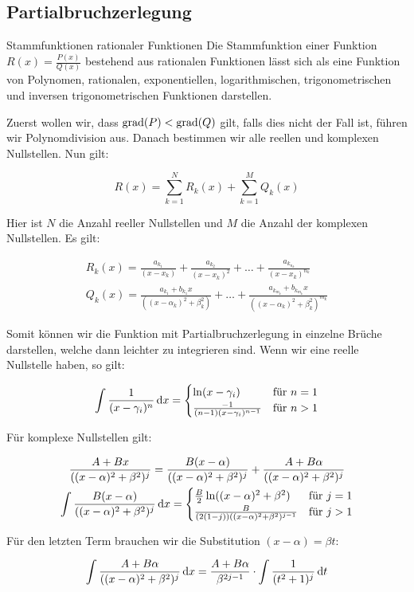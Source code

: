 \subsection{Partialbruchzerlegung}

\begin{KR}{Stammfunktionen rationaler Funktionen}
    Die Stammfunktion einer Funktion $R(x)=\frac{P(x)}{Q(x)}$ bestehend aus rationalen Funktionen lässt sich als eine Funktion von Polynomen, rationalen, exponentiellen, logarithmischen, trigonometrischen und inversen trigonometrischen Funktionen darstellen.

    Zuerst wollen wir, dass $\operatorname{grad}(P)<\operatorname{grad}(Q)$ gilt, falls dies nicht der Fall ist, führen wir Polynomdivision aus. Danach bestimmen wir alle reellen und komplexen Nullstellen. Nun gilt:

    $$R(x)=\sum_{k=1}^{N} R_{k}(x)+\sum_{k=1}^{M} Q_{k}(x)$$

    Hier ist $N$ die Anzahl reeller Nullstellen und $M$ die Anzahl der komplexen Nullstellen. Es gilt:

    $$\begin{gathered}
    R_{k}(x)=\frac{a_{k_{1}}}{(x-x_{k})}+\frac{a_{k_{2}}}{(x-x_{k})^{2}}+\ldots+\frac{a_{k_{n_{k}}}}{(x-x_{k})^{n_{k}}} \\
    Q_{k}(x)=\frac{a_{k_{1}}+b_{k_{1}} x}{((x-\alpha_{k})^{2}+\beta_{k}^{2})}+\ldots+\frac{a_{k_{m_{k}}}+b_{k_{m_{k}}} x}{((x-\alpha_{k})^{2}+\beta_{k}^{2})^{m_{k}}}
    \end{gathered}$$

    Somit können wir die Funktion mit Partialbruchzerlegung in einzelne Brüche darstellen, welche dann leichter zu integrieren sind. Wenn wir eine reelle Nullstelle haben, so gilt:

    $$\int \frac{1}{(x-\gamma_{i})^{n}} \dif x =\begin{cases}
    \ln (x-\gamma_{i}) & \text{für } n=1 \\
    \frac{-1}{(n-1)(x-\gamma_{i})^{n-1}} & \text{für } n > 1
    \end{cases}$$

    Für komplexe Nullstellen gilt:

    $$\begin{gathered}
    \frac{A+B x}{((x-\alpha)^{2}+\beta^{2})^{j}}=\frac{B(x-\alpha)}{((x-\alpha)^{2}+\beta^{2})^{j}}+\frac{A+B \alpha}{((x-\alpha)^{2}+\beta^{2})^{j}} \\
    \int \frac{B(x-\alpha)}{((x-\alpha)^{2}+\beta^{2})^{j}} \dif x =\begin{cases}
    \frac{B}{2} \ln ((x-\alpha)^{2}+\beta^{2}) & \text{für } j=1 \\
    \frac{B}{(2(1-j))((x-\alpha)^{2}+\beta^{2})^{j-1}} & \text{für } j > 1
    \end{cases}
    \end{gathered}$$

    Für den letzten Term brauchen wir die Substitution $(x-\alpha)=\beta t$:

    $$\int \frac{A+B \alpha}{((x-\alpha)^{2}+\beta^{2})^{j}} \dif x=\frac{A+B \alpha}{\beta^{2 j-1}} \cdot \int \frac{1}{(t^{2}+1)^{j}} \dif t$$
\end{KR}

